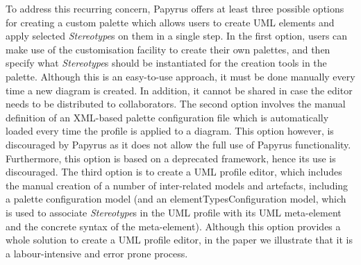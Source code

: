 To address this recurring concern, Papyrus offers at least three possible options for creating a custom palette which allows users to create UML elements and apply selected \textit{Stereotype}s on them in a single step. 
In the first option, users can make use of the customisation facility to create their own palettes, and then specify what \textit{Stereotype}s should be instantiated for the creation tools in the palette.
Although this is an easy-to-use approach, it must be done manually every time a new diagram is created.
In addition, it cannot be shared in case the editor needs to be distributed to collaborators. 
The second option involves the manual definition of an XML-based palette configuration file which is automatically loaded every time the profile is applied to a diagram. 
This option however, is discouraged by Papyrus as it does not allow the full use of Papyrus functionality.
Furthermore, this option is based on a deprecated framework, hence its use is discouraged. 
The third option is to create a UML profile editor, which includes the manual creation of a number of inter-related models and artefacts, including a palette configuration model (and an elementTypesConfiguration model, which is used to associate \textit{Stereotype}s in the UML profile with its UML meta-element and the concrete syntax of the meta-element). 
Although this option provides a whole solution to create a UML profile editor, in the paper we illustrate that it is a labour-intensive and error prone process.


